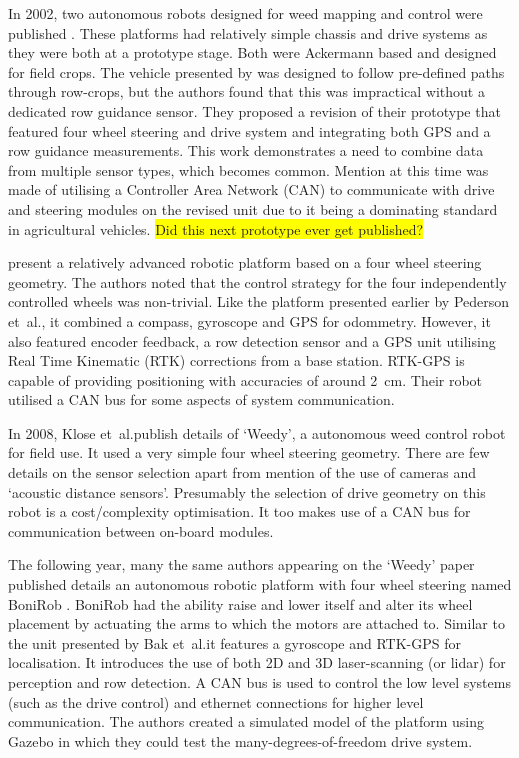 \documentclass[preprint,authoryear,12pt]{elsarticle}
\begin{document}
        In 2002, two autonomous robots designed for weed mapping and control were published \citep{Pedersen2002,Astrand2002}.
        These platforms had relatively simple chassis and drive systems as they were both at a prototype stage.
        Both were Ackermann based and designed for field crops.
        The vehicle presented by \cite{Pedersen2002} was designed to follow pre-defined paths through row-crops, but the authors found that this was impractical without a dedicated row guidance sensor.
        They proposed a revision of their prototype that featured four wheel steering and drive system and integrating both GPS and a row guidance measurements.
        This work demonstrates a need to combine data from multiple sensor types, which becomes common.
        Mention at this time was made of utilising a Controller Area Network (CAN) to communicate with drive and steering modules on the revised unit due to it being a dominating standard in agricultural vehicles.
        \colorbox{yellow}{Did this next prototype ever get published?}

        \cite{Bak2004} present a relatively advanced robotic platform based on a four wheel steering geometry.
        The authors noted that the control strategy for the four independently controlled wheels was non-trivial.
        Like the platform presented earlier by Pederson et~al.\@, it combined a compass, gyroscope and GPS for odommetry.
        However, it also featured encoder feedback, a row detection sensor and a GPS unit utilising Real Time Kinematic (RTK) corrections from a base station.
        RTK-GPS is capable of providing positioning with accuracies of around \SI{2}{\centi\meter}.
        Their robot utilised a CAN bus for some aspects of system communication.

        In 2008, Klose et~al.\@ publish details of `Weedy', a autonomous weed control robot for field use.
        It used a very simple four wheel steering geometry.
        There are few details on the sensor selection apart from mention of the use of cameras and `acoustic distance sensors'.
        Presumably the selection of drive geometry on this robot is a cost/complexity optimisation.
        It too makes use of a CAN bus for communication between on-board modules.

        The following year, many the same authors appearing on the `Weedy' paper published details an autonomous robotic platform with four wheel steering named BoniRob \citep{Ruckelshausen2009}.
        BoniRob had the ability raise and lower itself and alter its wheel placement by actuating the arms to which the motors are attached to.
        Similar to the unit presented by Bak et~al.\@ it features a gyroscope and RTK-GPS for localisation.
        It introduces the use of both 2D and 3D laser-scanning (or lidar) for perception and row detection.
        A CAN bus is used to control the low level systems (such as the drive control) and ethernet connections for higher level communication.
        The authors created a simulated model of the platform using Gazebo in which they could test the many-degrees-of-freedom drive system.
\end{document}

